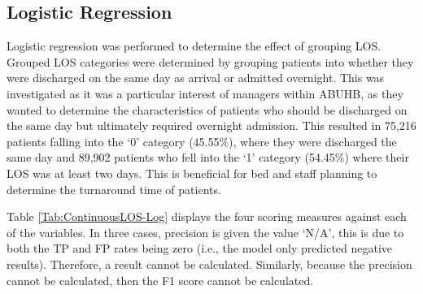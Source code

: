 \documentclass[../thesis.tex]{subfiles}
\begin{document}
\newpage
\subsection{Logistic Regression}\label{sec:logregresults}
Logistic regression was performed to determine the effect of grouping LOS. Grouped LOS categories were determined by grouping patients into whether they were discharged on the same day as arrival or admitted overnight. This was investigated as it was a particular interest of managers within ABUHB, as they wanted to determine the characteristics of patients who should be discharged on the same day but ultimately required overnight admission. This resulted in 75,216 patients falling into the `0' category (45.55\%), where they were discharged the same day and 89,902 patients who fell into the `1' category (54.45\%) where their LOS was at least two days. This is beneficial for bed and staff planning to determine the turnaround time of patients. 

Table \ref{Tab:ContinuousLOS-Log} displays the four scoring measures against each of the variables. In three cases, precision is given the value `N/A', this is due to both the TP and FP rates being zero (i.e., the model only predicted negative results). Therefore, a result cannot be calculated. Similarly, because the precision cannot be calculated, then the F1 score cannot be calculated.
\end{document}
